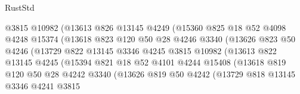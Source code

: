 \begin{lexlean}{RustStd}
\begin{coremodule}
                            @3815
                            @10982
                            (@13613
                              @826
                              @13145
                              @4249
                              (@15360
                                @825
                                @18
                                @52
                                @4098
                                @4248
                                @15374
                                (@13618
                                  @823
                                  @120
                                  @50
                                  @28
                                  @4246
                                  @3340
                                  (@13626
                                    @823
                                    @50
                                    @4246
                                    (@13729
                                      @822
                                      @13145
                                      @3346
                                      @4245
                                      @3815
                                      @10982
                                      (@13613
                                        @822
                                        @13145
                                        @4245
                                        (@15394
                                          @821
                                          @18
                                          @52
                                          @4101
                                          @4244
                                          @15408
                                          (@13618
                                            @819
                                            @120
                                            @50
                                            @28
                                            @4242
                                            @3340
                                            (@13626
                                              @819
                                              @50
                                              @4242
                                              (@13729
                                                @818
                                                @13145
                                                @3346
                                                @4241
                                                @3815

\end{coremodule}
\end{lexlean}
